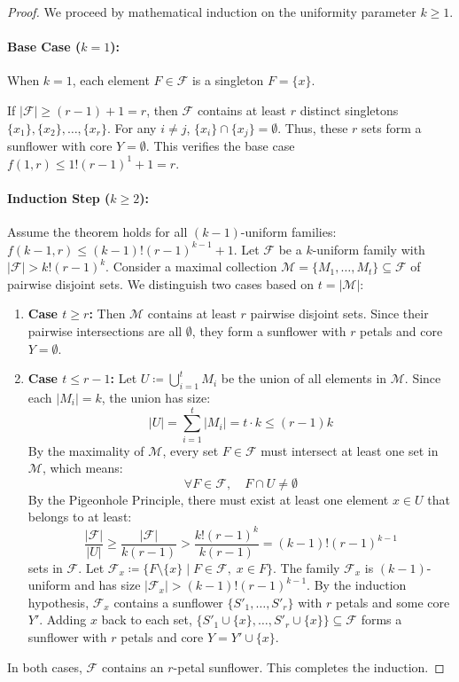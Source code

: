 \documentclass[11pt,a4paper]{article}
\theoremstyle{definition}
\begin{document}
\begin{proof}
We proceed by mathematical induction on the uniformity parameter $k \ge 1$.

\paragraph{Base Case ($k = 1$):}\label{thm:sunflower_base_k_one}
When $k = 1$, each element $F \in \mathcal{F}$ is a singleton $F = \{x\}$.

If $|\mathcal{F}| \ge (r - 1) + 1 = r$, then $\mathcal{F}$ contains at least $r$ distinct singletons $\{x_1\}, \{x_2\}, \dots, \{x_r\}$.
For any $i \ne j$, $\{x_i\} \cap \{x_j\} = \emptyset$.
Thus, these $r$ sets form a sunflower with core $Y = \emptyset$.
This verifies the base case $f(1, r) \le 1!(r - 1)^1 + 1 = r$.

\paragraph{Induction Step ($k \ge 2$):}
Assume the theorem holds for all $(k-1)$-uniform families: $f(k-1, r) \le (k-1)!(r-1)^{k-1} + 1$.
Let $\mathcal{F}$ be a $k$-uniform family with $|\mathcal{F}| > k!(r - 1)^k$.
Consider a maximal collection $\mathcal{M} = \{M_1, \dots, M_t\} \subseteq \mathcal{F}$ of pairwise disjoint sets.
We distinguish two cases based on $t = |\mathcal{M}|$:
\begin{enumerate}
    \item \textbf{Case $t \ge r$:}
    Then $\mathcal{M}$ contains at least $r$ pairwise disjoint sets. Since their pairwise intersections are all $\emptyset$, they form a sunflower with $r$ petals and core $Y = \emptyset$.
    \item \textbf{Case $t \le r - 1$:}
    Let $U \coloneqq \bigcup_{i=1}^t M_i$ be the union of all elements in $\mathcal{M}$.
    Since each $|M_i| = k$, the union has size:
    \[ |U| = \sum_{i=1}^t |M_i| = t \cdot k \le (r - 1) k \]
    By the maximality of $\mathcal{M}$, every set $F \in \mathcal{F}$ must intersect at least one set in $\mathcal{M}$, which means:
    \[ \forall F \in \mathcal{F}, \quad F \cap U \ne \emptyset \]
    By the Pigeonhole Principle, there must exist at least one element $x \in U$ that belongs to at least:
    \[ \frac{|\mathcal{F}|}{|U|} \ge \frac{|\mathcal{F}|}{k(r - 1)} > \frac{k!(r - 1)^k}{k(r - 1)} = (k - 1)!(r - 1)^{k-1} \]
    sets in $\mathcal{F}$.
    Let $\mathcal{F}_x \coloneqq \{F \setminus \{x\} \mid F \in \mathcal{F}, \; x \in F\}$.
    The family $\mathcal{F}_x$ is $(k-1)$-uniform and has size $|\mathcal{F}_x| > (k-1)!(r-1)^{k-1}$.
    By the induction hypothesis, $\mathcal{F}_x$ contains a sunflower $\{S'_1, \dots, S'_r\}$ with $r$ petals and some core $Y'$.
    Adding $x$ back to each set, $\{S'_1 \cup \{x\}, \dots, S'_r \cup \{x\}\} \subseteq \mathcal{F}$ forms a sunflower with $r$ petals and core $Y = Y' \cup \{x\}$.
\end{enumerate}
In both cases, $\mathcal{F}$ contains an $r$-petal sunflower. This completes the induction.
\end{proof}
\end{document}
